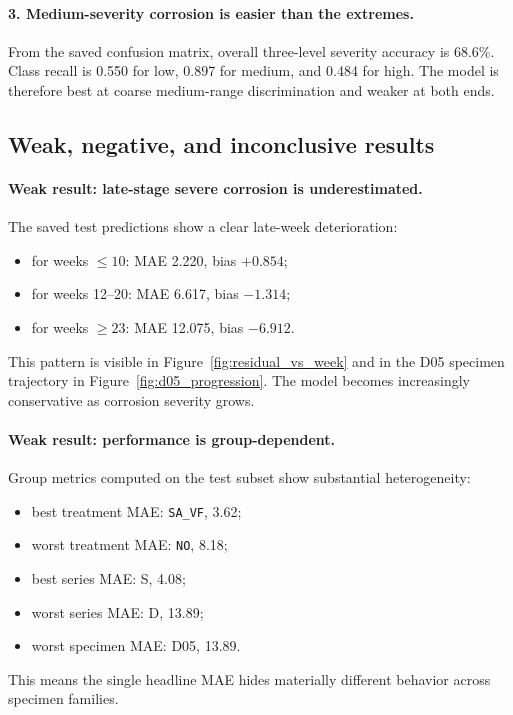 \documentclass[11pt]{article}
\begin{document}
\paragraph{3. Medium-severity corrosion is easier than the extremes.}
From the saved confusion matrix, overall three-level severity accuracy is 68.6\%. Class recall is 0.550 for low, 0.897 for medium, and 0.484 for high. The model is therefore best at coarse medium-range discrimination and weaker at both ends.

\subsection{Weak, negative, and inconclusive results}
\paragraph{Weak result: late-stage severe corrosion is underestimated.}
The saved test predictions show a clear late-week deterioration:
\begin{itemize}
  \item for weeks \(\leq 10\): MAE 2.220, bias \(+0.854\);
  \item for weeks 12--20: MAE 6.617, bias \(-1.314\);
  \item for weeks \(\geq 23\): MAE 12.075, bias \(-6.912\).
\end{itemize}
This pattern is visible in Figure~\ref{fig:residual_vs_week} and in the D05 specimen trajectory in Figure~\ref{fig:d05_progression}. The model becomes increasingly conservative as corrosion severity grows.

\paragraph{Weak result: performance is group-dependent.}
Group metrics computed on the test subset show substantial heterogeneity:
\begin{itemize}
  \item best treatment MAE: \texttt{SA\_VF}, 3.62;
  \item worst treatment MAE: \texttt{NO}, 8.18;
  \item best series MAE: S, 4.08;
  \item worst series MAE: D, 13.89;
  \item worst specimen MAE: D05, 13.89.
\end{itemize}
This means the single headline MAE hides materially different behavior across specimen families.
\end{document}
